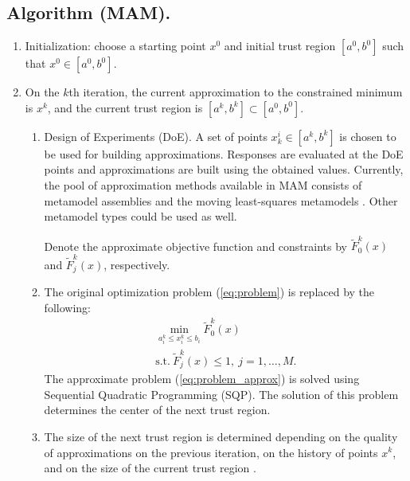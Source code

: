 \documentclass[a4paper]{llncs}
\begin{document}
\subsection*{Algorithm (MAM).}
\begin{enumerate}
\item Initialization: choose a starting point $ x^0$ and initial trust
    region $[ a^0,  b^0]$ such that $ x^0 \in [ a^0,  b^0]$.

\item On the $k$th iteration, the current approximation to the constrained
    minimum is $ x^k$, and the current trust region is $[ a^k,  b^k]
    \subset [ a^0,  b^0]$.
  \begin{enumerate}[label=(\alph*)]
    \item Design of Experiments (DoE). A set of points $ x_k^i \in [
        a^k,  b^k]$ is chosen to be used for building approximations.
        Responses are evaluated at the DoE points and approximations
        are built using the obtained values. Currently, the pool of
        approximation methods available in MAM consists of metamodel
        assemblies \cite{PolynkinToropov2012} and the moving
        least-squares metamodels
        \cite{LancasterSalkauskas1981,Liszka1984,ChoiYounYang2001,ToropovSchrammSahaiJones2005}.
        Other metamodel types could be used as well.

    Denote the approximate objective function and constraints by $\widetilde{F}^k_0(x)$ and $\widetilde{F}^k_j(x)$, respectively.

    \item The original optimization problem (\ref{eq:problem}) is
        replaced by the following:
    \begin{equation}
      \label{eq:problem_approx}
      \begin{array}{c}
      \min\limits_{a_i^k \le x_i ^k\le b_i}\widetilde{F}^k_0(x) \\
      \text{s.t.}\ \widetilde{F}^k_j( x) \le 1,\ j=1,\dots ,M.
      \end{array}
    \end{equation}
    The approximate problem (\ref{eq:problem_approx}) is solved using
    Sequential Quadratic Programming (SQP). The solution of this
    problem determines the center of the next trust region.

    \item The size of the next trust region is determined depending on
        the quality of approximations on the previous iteration, on the
        history of points $ x^k$, and on the size of the current trust
        region \cite{KeulenToropovMarkine1996}.


\end{enumerate}
\end{enumerate}
\end{document}
